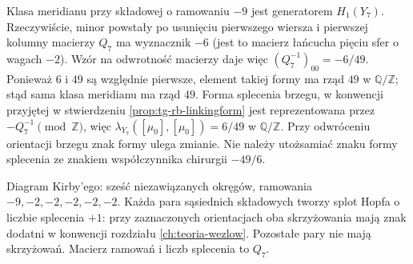 \begin{przyklad}
Klasa meridianu przy składowej o ramowaniu $-9$
jest generatorem $H_1(Y_7)$. Rzeczywiście, minor powstały po usunięciu pierwszego
wiersza i pierwszej kolumny macierzy $Q_7$
ma wyznacznik $-6$ (jest to macierz
łańcucha pięciu sfer o wagach $-2$). Wzór na odwrotność
macierzy daje więc $(Q_7^{-1})_{00}=-6/49$.
Ponieważ $6$ i $49$ są względnie pierwsze, element
takiej formy ma rząd $49$ w $\mathbb Q/\mathbb Z$;
stąd sama klasa meridianu ma rząd $49$.
Forma splecenia brzegu, w konwencji przyjętej w stwierdzeniu
\ref{prop:tg-rb-linkingform} jest reprezentowana
przez $-Q_7^{-1}\pmod{\mathbb Z}$, więc
$\lambda_{Y_7}([\mu_0],[\mu_0])=6/49$
w $\mathbb Q/\mathbb Z$. Przy odwróceniu orientacji
brzegu znak formy ulega zmianie.
Nie należy utożsamiać znaku formy splecenia
ze znakiem współczynnika chirurgii $-49/6$.
\end{przyklad}

\begin{center}

{\footnotesize Diagram Kirby'ego: sześć niezawiązanych okręgów,
ramowania $-9,-2,-2,-2,-2,-2$.
Każda para sąsiednich składowych tworzy splot Hopfa
o liczbie splecenia $+1$: przy zaznaczonych orientacjach
oba skrzyżowania mają znak dodatni w konwencji
rozdziału \ref{ch:teoria-wezlow}. Pozostałe pary nie mają
skrzyżowań. Macierz ramowań i liczb splecenia to $Q_7$.}
\end{center}

